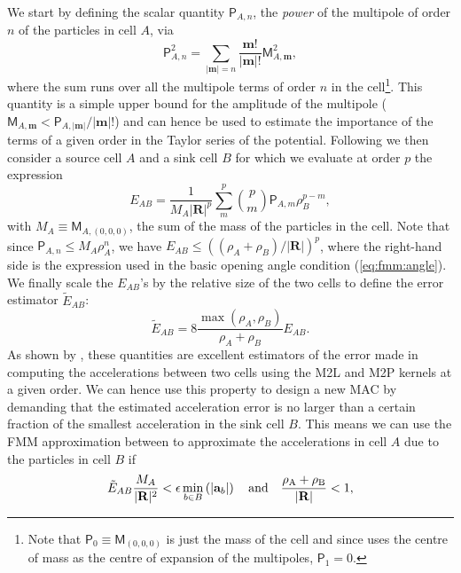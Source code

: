We start by defining the scalar quantity $\mathsf{P}_{A,n}$, the
\emph{power} of the multipole of order $n$ of the particles in cell $A$,
via
\begin{equation}
  \mathsf{P}_{A,n}^2 = \sum_{|\mathbf{m}|=n} \frac{\mathbf{m}!}{|\mathbf{m}|!}\mathsf{M}_{A,\mathbf{m}}^2,
\end{equation}
where the sum runs over all the multipole terms of order $n$ in the
cell\footnote{Note that $\mathsf{P}_{0} \equiv \mathsf{M}_{(0,0,0)}$ is
  just the mass of the cell and since \swift uses the centre of mass as the
  centre of expansion of the multipoles, $\mathsf{P}_{1} = 0$.}. This
quantity is a simple upper bound for the amplitude of the multipole
($\mathsf{M}_{A, \mathbf{m}} < \mathsf{P}_{A,|\mathbf{m}|}/|\mathbf{m}|!$)
and can hence be used to estimate the importance of the terms of a given
order in the Taylor series of the potential. Following \cite{Dehnen2014} we
then consider a source cell $A$ and a sink cell $B$ for which we evaluate
at order $p$ the expression
\begin{equation}
  E_{AB} = \frac{1}{M_A|\mathbf{R}|^p} \sum_m^p \binom{p}{m} \mathsf{P}_{A,m}
  \rho_B^{p-m},
  \label{eq:fmm:e_ab}
\end{equation}
with $M_A \equiv \mathsf{M}_{A,(0,0,0)}$, the sum of the mass of the
particles in the cell. Note that since $\mathsf{P}_{A,n} \leq M_A
\rho_A^n$, we have $E_{AB} \leq \left((\rho_A +
\rho_B)/|\mathbf{R}|\right)^p$, where the right-hand side is the expression
used in the basic opening angle condition (\ref{eq:fmm:angle}). We finally
scale the $E_{AB}$'s by the relative size of the two cells to define the
error estimator $\tilde{E}_{AB}$:
\begin{equation}
  \tilde{E}_{AB} = 8\frac{\max(\rho_A, \rho_B)}{\rho_A + \rho_B}E_{AB}.
  \label{eq:fmm:e_ab_tilde}
\end{equation}
As shown by \cite{Dehnen2014}, these quantities are excellent estimators of
the error made in computing the accelerations between two cells using the
M2L and M2P kernels at a given order. We can hence use this property to
design a new MAC by demanding that the estimated acceleration error is no
larger than a certain fraction of the smallest acceleration in the sink
cell $B$. This means we can use the FMM approximation between to
approximate the accelerations in cell $A$ due to the particles in cell $B$ if
\begin{equation}
  \tilde{E}_{AB} \frac{M_A}{|\mathbf{R}|^2} < \epsilon \min_{b\in
    B}\left(|\mathbf{a}_b|\right) \quad \rm{and} \quad \frac{\rho_A +
    \rho_B} {|\mathbf{R}|} < 1,
  \label{eq:fmm:mac}  
\end{equation}
